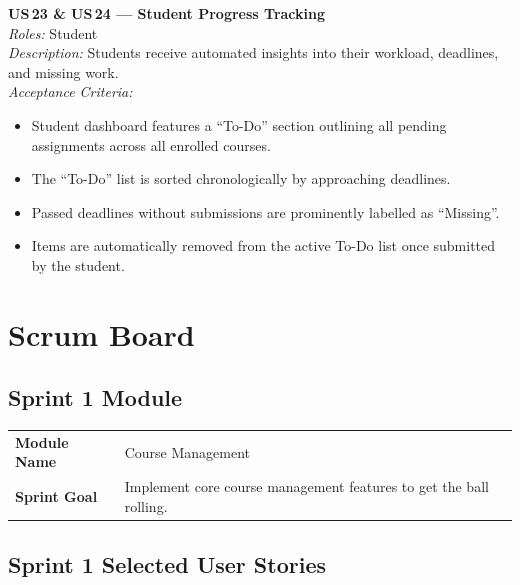 \documentclass[12pt, a4paper]{article}
\begin{document}
\begin{userstory}
  \textbf{US\,23 \& US\,24 — Student Progress Tracking}\\[4pt]
  \textit{Roles:} Student\\[2pt]
  \textit{Description:} Students receive automated insights into their
  workload, deadlines, and missing work.\\[4pt]
  \textit{Acceptance Criteria:}
  \begin{itemize}
    \item Student dashboard features a ``To-Do'' section outlining all pending
          assignments across all enrolled courses.
    \item The ``To-Do'' list is sorted chronologically by approaching
          deadlines.
    \item Passed deadlines without submissions are prominently labelled as
          ``Missing''.
    \item Items are automatically removed from the active To-Do list once
          submitted by the student.
  \end{itemize}
\end{userstory}

\section{Scrum Board}

\subsection{Sprint 1 Module}

\begin{center}
\begin{tabularx}{0.8\linewidth}{lX}
  \toprule
  \textbf{Module Name} & Course Management \\
  \textbf{Sprint Goal} & Implement core course management features to get the ball rolling. \\
  \bottomrule
\end{tabularx}
\end{center}

\subsection{Sprint 1 Selected User Stories}
\end{document}
